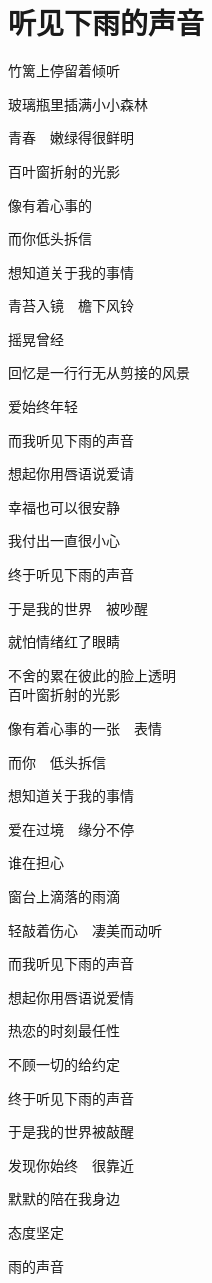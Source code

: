 \documentclass[a4paper,10pt]{article}
\title{}
\author{}
\date{}
\begin{document}
\maketitle
\section{听见下雨的声音}

竹篱上停留着倾听

玻璃瓶里插满小小森林

青春　嫩绿得很鲜明

百叶窗折射的光影

像有着心事的

而你低头拆信

想知道关于我的事情

青苔入镜　檐下风铃

摇晃曾经

回忆是一行行无从剪接的风景

爱始终年轻

而我听见下雨的声音

想起你用唇语说爱请

幸福也可以很安静

我付出一直很小心

终于听见下雨的声音

于是我的世界　被吵醒

就怕情绪红了眼睛

不舍的累在彼此的脸上透明
\\

百叶窗折射的光影

像有着心事的一张　表情

而你　低头拆信

想知道关于我的事情

爱在过境　缘分不停

谁在担心

窗台上滴落的雨滴

轻敲着伤心　凄美而动听

而我听见下雨的声音

想起你用唇语说爱情

热恋的时刻最任性

不顾一切的给约定

终于听见下雨的声音

于是我的世界被敲醒

发现你始终　很靠近

默默的陪在我身边

态度坚定

雨的声音
\end{document}
